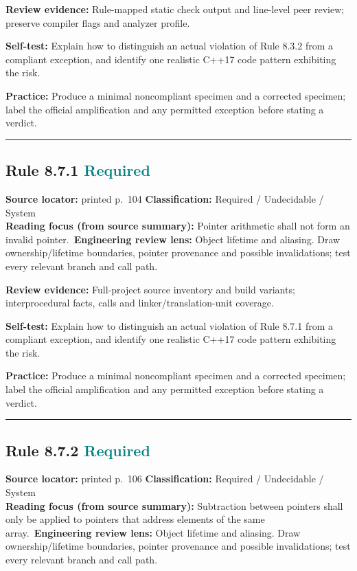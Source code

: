 \documentclass[10pt,letterpaper]{article}
\begin{document}
\textbf{Review evidence:} Rule-mapped static check output and line-level peer review; preserve compiler flags and analyzer profile.

\textbf{Self-test:} Explain how to distinguish an actual violation of Rule 8.3.2 from a compliant exception, and identify one realistic C++17 code pattern exhibiting the risk.\par
\textbf{Practice:} Produce a minimal noncompliant specimen and a corrected specimen; label the official amplification and any permitted exception before stating a verdict.
\smallskip\hrule\smallskip
\subsection*{Rule 8.7.1 \enspace \texorpdfstring{\small\textcolor{teal}{Required}}{Required}}
\noindent\textbf{Source locator:} printed p.~104 \quad\textbf{Classification:} Required / Undecidable / System\\
\textbf{Reading focus (from source summary):} Pointer arithmetic shall not form an invalid pointer.\
\textbf{Engineering review lens:} Object lifetime and aliasing. Draw ownership/lifetime boundaries, pointer provenance and possible invalidations; test every relevant branch and call path.

\textbf{Review evidence:} Full-project source inventory and build variants; interprocedural facts, calls and linker/translation-unit coverage.

\textbf{Self-test:} Explain how to distinguish an actual violation of Rule 8.7.1 from a compliant exception, and identify one realistic C++17 code pattern exhibiting the risk.\par
\textbf{Practice:} Produce a minimal noncompliant specimen and a corrected specimen; label the official amplification and any permitted exception before stating a verdict.
\smallskip\hrule\smallskip
\subsection*{Rule 8.7.2 \enspace \texorpdfstring{\small\textcolor{teal}{Required}}{Required}}
\noindent\textbf{Source locator:} printed p.~106 \quad\textbf{Classification:} Required / Undecidable / System\\
\textbf{Reading focus (from source summary):} Subtraction between pointers shall only be applied to pointers that address elements of the same array.\
\textbf{Engineering review lens:} Object lifetime and aliasing. Draw ownership/lifetime boundaries, pointer provenance and possible invalidations; test every relevant branch and call path.
\end{document}
